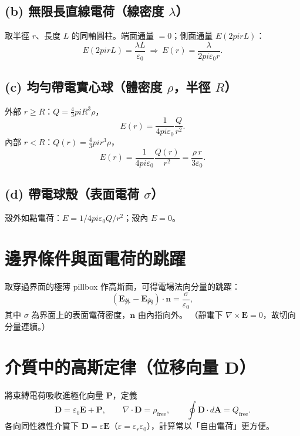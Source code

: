 \documentclass{article}
\def\pi{pi}%
\def\hat#1{#1}%
\def\dfrac#1#2{#1/#2}%
\begin{document}
\subsection*{(b) 無限長直線電荷（線密度 $\lambda$）}
取半徑 $r$、長度 $L$ 的同軸圓柱。端面通量 $=0$；側面通量 $E(2\pi r L)$：
\begin{equation}
E(2\pi r L)=\frac{\lambda L}{\varepsilon_0}
\ \Rightarrow\
E(r)=\frac{\lambda}{2\pi\varepsilon_0 r}.
\end{equation}

\subsection*{(c) 均勻帶電實心球（體密度 $\rho$，半徑 $R$）}
外部 $r\ge R$：$Q=\frac{4}{3}\pi R^3\rho$，
\begin{equation}
E(r)=\frac{1}{4\pi\varepsilon_0}\frac{Q}{r^2}.
\end{equation}
內部 $r<R$：$Q(r)=\frac{4}{3}\pi r^3\rho$，
\begin{equation}
E(r)=\frac{1}{4\pi\varepsilon_0}\frac{Q(r)}{r^2}
=\frac{\rho\, r}{3\varepsilon_0}.
\end{equation}

\subsection*{(d) 帶電球殼（表面電荷 $\sigma$）}
殼外如點電荷：$E=\dfrac{1}{4\pi\varepsilon_0}\dfrac{Q}{r^2}$；殼內 $E=0$。

\section{邊界條件與面電荷的跳躍}
取穿過界面的極薄 pillbox 作高斯面，可得電場法向分量的跳躍：
\begin{equation}
(\mathbf{E}_{\text{外}}-\mathbf{E}_{\text{內}})\cdot\hat{\mathbf{n}}
=\frac{\sigma}{\varepsilon_0},
\end{equation}
其中 $\sigma$ 為界面上的表面電荷密度，$\hat{\mathbf{n}}$ 由內指向外。
（靜電下 $\nabla\times\mathbf{E}=0$，故切向分量連續。）

\section{介質中的高斯定律（位移向量 $\mathbf{D}$）}
將束縛電荷吸收進極化向量 $\mathbf{P}$，定義
\begin{equation}
\mathbf{D}=\varepsilon_0\mathbf{E}+\mathbf{P},
\qquad
\nabla\!\cdot\!\mathbf{D}=\rho_{\text{free}},
\qquad
\oint \mathbf{D}\cdot d\mathbf{A}=Q_{\text{free}}.
\end{equation}
各向同性線性介質下 $\mathbf{D}=\varepsilon\mathbf{E}$（$\varepsilon=\varepsilon_r\varepsilon_0$），計算常以「自由電荷」更方便。
\end{document}
